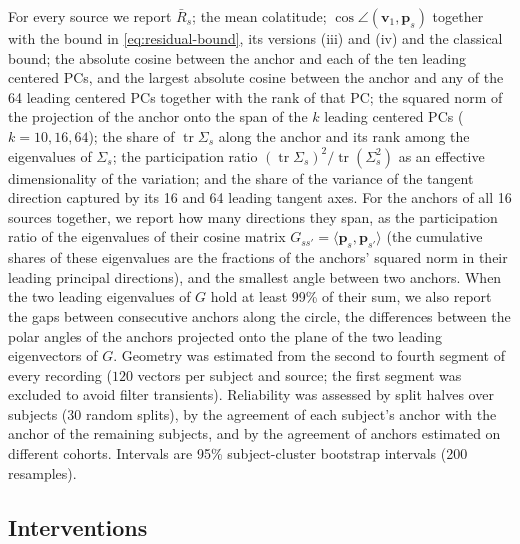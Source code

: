 \documentclass[10pt,letterpaper]{article}
\newcommand{\Rbar}{\bar{R}}
\newcommand{\anchor}{\bm{p}}
\begin{document}
For every source we report $\Rbar_s$; the mean colatitude; $\cos\angle(\bm{v}_1,\anchor_s)$
together with the bound in \cref{eq:residual-bound}, its versions (iii) and (iv) and the
classical bound; the absolute cosine between the anchor and each of the ten leading centered PCs,
and the largest absolute cosine between the anchor and any of the 64 leading centered PCs together
with the rank of that PC;
the squared norm of the projection of the anchor onto the span of the $k$ leading centered
PCs ($k=10,16,64$); the share of $\operatorname{tr}\Sigma_s$ along the anchor and its rank
among the eigenvalues of $\Sigma_s$; the participation ratio
$(\operatorname{tr}\Sigma_s)^2/\operatorname{tr}(\Sigma_s^2)$ as an effective
dimensionality of the variation; and the share of the variance of the tangent direction
captured by its 16 and 64 leading tangent axes. For the anchors of all 16 sources together, we
report how many directions they span, as the participation ratio of the eigenvalues of their
cosine matrix $G_{ss'}=\langle\anchor_s,\anchor_{s'}\rangle$ (the cumulative shares of these
eigenvalues are the fractions of the anchors' squared norm in their leading principal directions),
and the smallest angle between two anchors. When the two leading eigenvalues of $G$ hold at least
99\% of their sum, we also report the gaps between consecutive anchors along the circle, the
differences between the polar angles of the anchors projected onto the plane of the two leading
eigenvectors of $G$. Geometry was estimated from the second to
fourth segment of every recording ($120$ vectors per subject and source; the first segment
was excluded to avoid filter transients). Reliability was assessed by split halves over
subjects (30 random splits), by the agreement of each subject's anchor with the anchor of
the remaining subjects, and by the agreement of anchors estimated on different cohorts.
Intervals are 95\% subject-cluster bootstrap intervals (200 resamples).

\subsection*{Interventions}\label{sec:methods-interventions}
\end{document}
